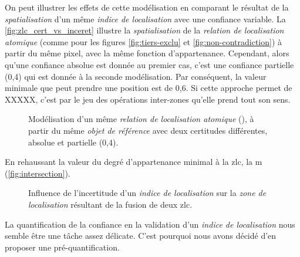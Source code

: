 On peut illustrer les effets de cette modélisation en comparant le
résultat de la \emph{spatialisation} d'un même \emph{indice de
  localisation} avec une confiance variable. La
\autoref{fig:zlc_cert_vs_inceret} illustre la \emph{spatialisation} de
la \emph{relation de localisation atomique} 
(comme pour les figures \ref{fig:tiers-exclu} et
\ref{fig:non-contradiction}) à partir du même pixel, avec la même
fonction d'appartenance. Cependant, alors qu'une confiance absolue est
donnée au premier cas, c'est une confiance partielle (0,4) qui est
donnée à la seconde modélisation. Par conséquent, la valeur minimale
que peut prendre une position est de 0,6. Si cette approche permet de
XXXXX, c'est par le jeu des opérations inter-zones qu'elle prend tout
son sens.

\begin{figure}
  \centering
  \subfloat[]{}\hspace{2cm}
  \subfloat[]{}
  \caption{Modélisation d'un même \emph{relation de localisation
      atomique} (\protect{}), à partir du même
    \emph{objet de référence} avec deux certitudes différentes,
    absolue et partielle (0,4).}
  \label{fig:zlc_cert_vs_inceret}
\end{figure}

En rehaussant la valeur du degré d'appartenance minimal à la \ac{zlc},
la m (\autoref{fig:intersection}).

\begin{figure}
  \centering
  \subfloat[]{}

  \subfloat[]{}
  \caption{Influence de l'incertitude d'un \emph{indice de
      localisation} sur la \emph{zone de localisation} résultant de la
    fusion de deux \ac{zlc}.}
  \label{fig:intersection}
\end{figure}

La quantification de la confiance en la validation d'un \emph{indice
  de localisation} nous semble être une tâche assez délicate. C'est
pourquoi nous avons décidé d'en proposer une pré-quantification.

